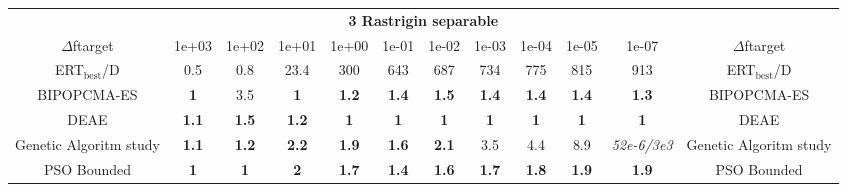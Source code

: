 \begin{tabular}{cccccccccccc}
 & \multicolumn{10}{c}{{\normalsize \textbf{3 Rastrigin separable}}}\\
$\Delta$ftarget& 1e+03& 1e+02& 1e+01& 1e+00& 1e-01& 1e-02& 1e-03& 1e-04& 1e-05& 1e-07 & $\Delta$ftarget \\
ERT$_{\textrm{best}}$/D& 0.5& 0.8& 23.4& 300& 643& 687& 734& 775& 815& 913 & ERT$_{\textrm{best}}$/D \\
\hline
BIPOPCMA-ES & \textbf{1} & 3.5 & \textbf{1} & \textbf{1.2} & \textbf{1.4} & \textbf{1.5} & \textbf{1.4} & \textbf{1.4} & \textbf{1.4} & \textbf{1.3} & BIPOPCMA-ES \cite{add_an_entry_for_BIPOPCMA-ES_in_bbob.bib}\\
DEAE & \textbf{1.1} & \textbf{1.5} & \textbf{1.2} & \textbf{1} & \textbf{1} & \textbf{1} & \textbf{1} & \textbf{1} & \textbf{1} & \textbf{1} & DEAE \cite{add_an_entry_for_DEAE_in_bbob.bib}\\
Genetic Algoritm study & \textbf{1.1} & \textbf{1.2} & \textbf{2.2} & \textbf{1.9} & \textbf{1.6} & \textbf{2.1} & 3.5 & 4.4 & 8.9 & \textit{52e-6}\textit{/3e3} & Genetic Algoritm study \cite{add_an_entry_for_Genetic Algoritm study_in_bbob.bib}\\
PSO Bounded & \textbf{1} & \textbf{1} & \textbf{2} & \textbf{1.7} & \textbf{1.4} & \textbf{1.6} & \textbf{1.7} & \textbf{1.8} & \textbf{1.9} & \textbf{1.9} & PSO Bounded \cite{add_an_entry_for_PSO Bounded_in_bbob.bib}
\end{tabular}
